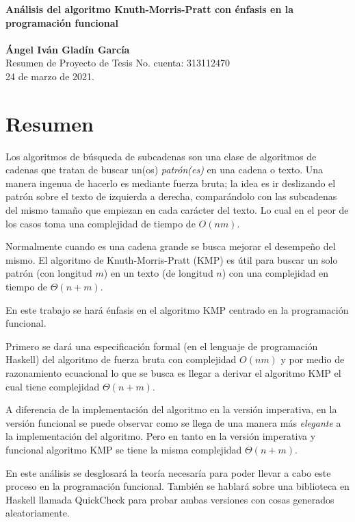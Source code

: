 \documentclass[letterpaper,11pt]{article}
\begin{document}
\noindent
\large
\textbf{Análisis del algoritmo Knuth-Morris-Pratt con énfasis en la programación funcional} \\\\
\textbf{Ángel Iván Gladín García} \\
\normalsize Resumen de Proyecto de Tesis       \hfill No. cuenta: 313112470\\
\hfill 24 de marzo de 2021.\\

\vspace*{-15pt}

\section{Resumen}
Los algoritmos de búsqueda de subcadenas son una clase de algoritmos de cadenas que tratan de
buscar un(os) \emph{patrón(es)} en una cadena o texto.
Una manera ingenua de hacerlo es mediante fuerza bruta; la idea es ir deslizando el patrón sobre
el texto de izquierda a derecha, comparándolo con las subcadenas del mismo tamaño que empiezan en
cada carácter del texto. Lo cual en el peor de los casos toma una complejidad de tiempo de $O(nm)$.

Normalmente cuando es una cadena grande se busca mejorar el desempeño del mismo. El algoritmo de
Knuth-Morris-Pratt (KMP) es útil para buscar un solo patrón (con longitud $m$) en un texto (de
longitud $n$) con una complejidad en tiempo de $\Theta(n + m)$.

En este trabajo se hará énfasis en el algoritmo KMP centrado en la programación funcional.

Primero se dará una especificación formal (en el lenguaje de programación Haskell) del algoritmo
de fuerza bruta con complejidad $O(nm)$ y por medio de razonamiento ecuacional lo que se busca
es llegar a derivar el algoritmo KMP el cual tiene complejidad $\Theta(n + m)$.

A diferencia de la implementación del algoritmo en la versión imperativa, en la versión funcional
se puede observar como se llega de una manera más \textit{elegante} a la implementación del
algoritmo. Pero en tanto en la versión imperativa y funcional algoritmo KMP se tiene la misma
complejidad $\Theta(n + m)$.

En este análisis se desglosará la teoría necesaría para poder llevar a cabo este proceso en la
programación funcional. También se hablará sobre una biblioteca en Haskell llamada QuickCheck
para probar ambas versiones con cosas generados aleatoriamente.
\end{document}
